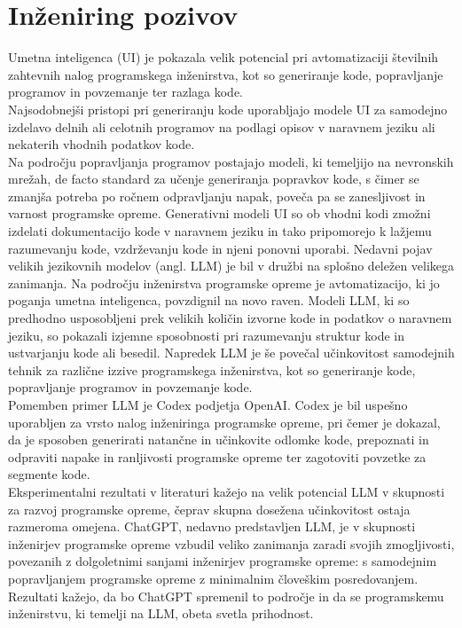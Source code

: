 \documentclass[a4paper,12pt,openright]{book}
\begin{document}
\section{Inženiring pozivov} \label{chap:inz-poz}

Umetna inteligenca (UI) je pokazala velik potencial pri avtomatizaciji številnih zahtevnih nalog programskega inženirstva, kot so generiranje kode, popravljanje programov in povzemanje ter razlaga kode. \cite{bavishi2019autopandas} \\
Najsodobnejši pristopi pri generiranju kode uporabljajo modele UI za samodejno izdelavo delnih ali celotnih programov na podlagi opisov v naravnem jeziku ali nekaterih vhodnih podatkov kode. \cite{Chen2021EvaluatingLL}\\
Na področju popravljanja programov postajajo modeli, ki temeljijo na nevronskih mrežah, de facto standard za učenje generiranja popravkov kode, s čimer se zmanjša potreba po ročnem odpravljanju napak, poveča pa se zanesljivost in varnost programske opreme. Generativni modeli UI so ob vhodni kodi zmožni izdelati dokumentacijo kode v naravnem jeziku in tako pripomorejo k lažjemu razumevanju kode, vzdrževanju kode in njeni ponovni uporabi. Nedavni pojav velikih jezikovnih modelov (angl. LLM) je bil v družbi na splošno deležen velikega zanimanja. Na področju inženirstva programske opreme je avtomatizacijo, ki jo poganja umetna inteligenca, povzdignil na novo raven. Modeli LLM, ki so predhodno usposobljeni prek velikih količin izvorne kode in podatkov o naravnem jeziku, so pokazali izjemne sposobnosti pri razumevanju struktur kode in ustvarjanju kode ali besedil. Napredek LLM je še povečal učinkovitost samodejnih tehnik za različne izzive programskega inženirstva, kot so generiranje kode, popravljanje programov in povzemanje kode. \cite{wan2018improving}\\
Pomemben primer LLM je  Codex podjetja OpenAI. Codex je bil uspešno uporabljen za vrsto nalog inženiringa programske opreme, pri čemer je dokazal, da je sposoben generirati natančne in učinkovite odlomke kode, prepoznati in odpraviti napake in ranljivosti programske opreme ter zagotoviti povzetke za segmente kode. \cite{vaithilingam2022expectation} \\
Eksperimentalni rezultati v literaturi kažejo na velik potencial LLM v skupnosti za razvoj programske opreme, čeprav skupna dosežena učinkovitost ostaja razmeroma omejena. ChatGPT, nedavno predstavljen LLM, je v skupnosti inženirjev programske opreme vzbudil veliko zanimanja zaradi svojih zmogljivosti, povezanih z dolgoletnimi sanjami inženirjev programske opreme: s samodejnim popravljanjem programske opreme z minimalnim človeškim posredovanjem. Rezultati kažejo, da bo ChatGPT spremenil to področje in da se programskemu inženirstvu, ki temelji na LLM, obeta svetla prihodnost. \cite{tian2023chatgptultimateprogrammingassistant} \\
\end{document}
